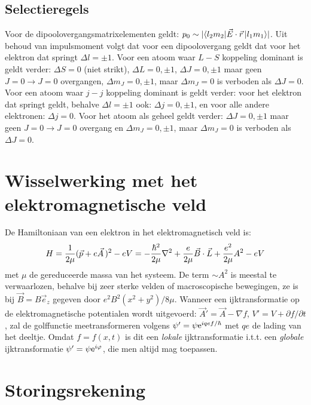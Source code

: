 \documentclass[twoside]{report}
\begin{document}
\subsection[~~Selectieregels]{Selectieregels}
Voor de dipoolovergangsmatrixelementen geldt:
$p_0\sim|\langle l_2m_2|\vec{E}\cdot\vec{r}\,|l_1m_1\rangle|$. Uit behoud van
impulsmoment volgt dat voor een dipoolovergang geldt dat voor het elektron
dat springt $\Delta l=\pm1$.
\npar
Voor een atoom waar $L-S$ koppeling dominant is geldt verder: $\Delta S=0$
(niet strikt), $\Delta L=0,\pm1$, $\Delta J=0,\pm1$ maar geen
$J=0\rightarrow J=0$ overgangen, $\Delta m_J=0,\pm1$, maar $\Delta m_J=0$
is verboden als $\Delta J=0$.
\npar
Voor een atoom waar $j-j$ koppeling dominant is geldt verder: voor het
elektron dat springt geldt, behalve $\Delta l=\pm1$ ook: $\Delta j=0,\pm1$,
en voor alle andere elektronen: $\Delta j=0$. Voor het atoom als geheel geldt
verder: $\Delta J=0,\pm1$ maar geen $J=0\rightarrow J=0$ overgang en
$\Delta m_J=0,\pm1$, maar $\Delta m_J=0$ is verboden als $\Delta J=0$.

\section[~~Wisselwerking met het elektromagnetische veld]{Wisselwerking met het elektromagnetische veld}
De Hamiltoniaan van een elektron in het elektromagnetisch veld is:
\[
H=\frac{1}{2\mu}(\vec{p}+e\vec{A}\,)^2-eV=-\frac{\hbar^2}{2\mu}\nabla^2+
\frac{e}{2\mu}\vec{B}\cdot\vec{L}+\frac{e^2}{2\mu}A^2-eV
\]
met $\mu$ de gereduceerde massa van het systeem. De term $\sim A^2$ is meestal
te verwaarlozen, behalve bij zeer sterke velden of macroscopische bewegingen,
ze is bij $\vec{B}=B\vec{e}_z$ gegeven door $e^2B^2(x^2+y^2)/8\mu$.
\npar
Wanneer een ijktransformatie op de elektromagnetische potentialen wordt
uitgevoerd: $\vec{A}'=\vec{A}-\nabla f$, $V'=V+\partial f/\partial t$, zal de
golffunctie meetransformeren volgens $\psi'=\psi{\rm e}^{iqef/\hbar}$ met
$qe$ de lading van het deeltje. Omdat $f=f(x,t)$ is dit een {\it lokale}
ijktransformatie i.t.t. een {\it globale} ijktransformatie
$\psi'=\psi{\rm e}^{i\varphi}$, die men altijd mag toepassen.

\section[~~Storingsrekening]{Storingsrekening}
\end{document}
